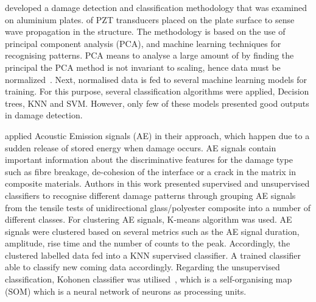  developed a damage detection and classification methodology that was examined on aluminium plates.
 of PZT transducers  placed on the plate surface to sense wave propagation in the structure.
The methodology is based on the use of principal component analysis (PCA), and machine learning techniques for recognising patterns. 
PCA means to analyse a large amount of   by finding the principal   the PCA method is not invariant to scaling, hence data must be normalized~\cite{Tibaduiza2016}. 
Next, normalised data is fed to several machine learning models for training. 
For this purpose, several classification algorithms were applied, Decision trees, KNN and SVM. 
However, only few of these models presented good outputs in damage detection. 

 applied Acoustic Emission signals (AE) in their approach, which happen due to a sudden release of stored energy when damage occurs.
AE signals contain important information about the discriminative features 
for the damage type such as fibre breakage, de-cohesion of the interface or a crack in the matrix in composite materials.
Authors in this work presented supervised and unsupervised classifiers to recognise different damage patterns through grouping AE signals from the tensile tests of unidirectional glass/polyester composite into a number of different classes. 
For clustering AE signals, K-means algorithm was used. AE signals were clustered based on several metrics such as the AE signal duration, amplitude, rise time and the number of counts to the peak.
Accordingly, the clustered labelled data   fed into a KNN supervised classifier.
A trained classifier   able to classify new coming data accordingly.
Regarding the unsupervised classification, Kohonen classifier was utilised~\cite{58325}, which is a self-organising map (SOM) which is a neural network   of neurons as processing units. 

